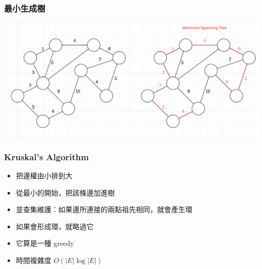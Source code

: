 \documentclass[aspectratio=169]{beamer}
\begin{document}
    \begin{frame}
        \frametitle{最小生成樹}
        \begin{center}
            \includegraphics[scale=0.45]{images/mst.png}
        \end{center}
    \end{frame}
    
    
    \begin{frame}
        \frametitle{Kruskal's Algorithm}
        \begin{itemize}
            \item 把邊權由小排到大
            \item 從最小的開始，把該條邊加進樹
            \item 並查集維護：如果邊所連接的兩點祖先相同，就會產生環
            \item 如果會形成環，就略過它
            \item 它算是一種 greedy
            \item 時間複雜度 $O(|E| \log|E|)$
        \end{itemize}
    \end{frame}
    
\end{document}
